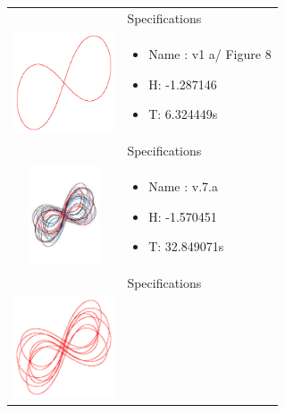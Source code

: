 \begin{table}[H]
	\centering
	\begin{tabular}{ | c | m{5cm}| }
		\hline
		& Specifications\\ 
		\begin{minipage}{.3\textwidth}
			\includegraphics[width=30mm, height=30mm]{chapters/chapter5/v1a}
		\end{minipage}
		&
		\begin{itemize}
			\item Name : v1 a/ Figure 8
			\item H: -1.287146 
			\item T: 6.324449s
		\end{itemize}\\
		\hline
		& Specifications\\ 
		\begin{minipage}{.3\textwidth}
			\includegraphics[width=30mm, height=30mm]{chapters/chapter5/v7a}
		\end{minipage}
		&
		\begin{itemize}
			\item Name : v.7.a 
			\item H: -1.570451 
			\item T: 32.849071s
		\end{itemize}\\
		\hline
		& Specifications\\ 
		\begin{minipage}{.3\textwidth}
			\includegraphics[width=30mm, height=30mm]{chapters/chapter5/v7c.pdf}

\end{minipage}
\end{tabular}
\end{table}
